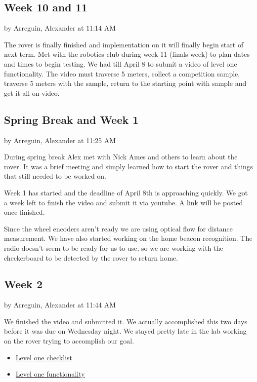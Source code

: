 \documentclass[10pt, oneside,onecolumn]{IEEEtran}
\begin{document}
\begin{titlepage}
\subsection{Week 10 and 11}
by Arreguin, Alexander at 11:14 AM

The rover is finally finished and implementation on it will finally begin start of next term. Met with the robotics club during week 11 (finals week) to plan dates and times to begin testing. We had till April 8 to submit a video of level one functionality. The video must traverse 5 meters, collect a competition sample, traverse 5 meters with the sample, return to the starting point with sample and get it all on video. 

\subsection{Spring Break and Week 1}
by Arreguin, Alexander at 11:25 AM

During spring break Alex met with Nick Ames and others to learn about the rover. It was a brief meeting and simply learned how to start the rover and things that still needed to be worked on. 

Week 1 has started and the deadline of April 8th is approaching quickly. We got a week left to finish the video and submit it via youtube. A link will be posted once finished.

Since the wheel encoders aren't ready we are using optical flow for distance measurement. We have also started working on the home beacon recognition. The radio doesn't seem to be ready for us to use, so we are working with the checkerboard to be detected by the rover to return home. 

\subsection{Week 2}
by Arreguin, Alexander at 11:44 AM

We finished the video and submitted it. We actually accomplished this two days before it was due on Wednesday night. We stayed pretty late in the lab working on the rover trying to accomplish our goal.  

\begin{itemize}
\item \href{https://drive.google.com/open?id=1lH9-26Qdjt1_Ppa7h6n0BpqmCCp4h-UH45eNqOTPJ3U}
{Level one checklist}

\item \href{https://www.youtube.com/watch?v=H8sDekAOodg}
{ Level one functionality}
\end{itemize}


\end{titlepage}
\end{document}
